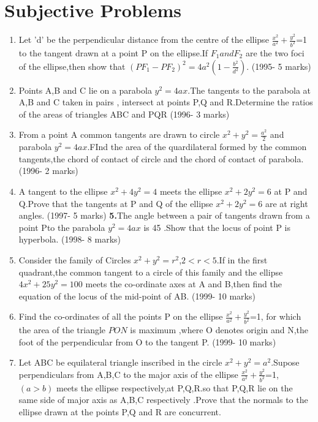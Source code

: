 \documentclass[journal,12pt,twocolumn]{IEEEtran}
\theoremstyle{remark}
\begin{document}
\section{Subjective Problems}
\begin{enumerate}
\item Let 'd' be the perpendicular distance from the centre of the ellipse $\frac{x^2}{a^2}+\frac{y^2}{b^2}$=1  to the tangent drawn at a point P on the ellipse.If $F_1 and F_2$ are the two foci of the ellipse,then show that $(P{F_1}-P{F_2})^2=4a^2(1-\frac{b^2}{d^2})$.
\hfill(1995- 5 marks)\break
\newline
\item Points A,B and C lie on a parabola $y^2=4ax$.The tangents to the parabola at A,B and C taken in pairs , intersect at points P,Q and R.Determine the ratios of the areas of triangles ABC and PQR \hfill(1996- 3 marks)\break\newline
\item From a point A common tangents  are drawn to circle $x^2+y^2=\frac{a^2}{2}$ and parabola $y^2=4ax$.FInd the area of the quardilateral formed by the common tangents,the chord of contact of circle and the chord of contact of parabola.
\hfill(1996- 2 marks)\break\newline
\item A tangent to the ellipse $x^2+4y^2=4$ meets the ellipse $x^2+2y^2=6$ at P and Q.Prove that the tangents at P and Q of the ellipse $x^2+2y^2=6$ are at right angles.
\hfill(1997- 5 marks)\break\newline
\textbf{5.}The angle between a pair of tangents drawn from a point Pto the parabola $y^2=4ax$ is 45 .Show that the locus of point P is hyperbola.
\hfill(1998- 8 marks)\break\newline
\item Consider the family of Circles $x^2+y^2=r^2$,$2<r<5$.If in the first quadrant,the common tangent to a circle of this family and the ellipse $4x^2+25y^2=100$ meets the co-ordinate axes at A and B,then find the equation of the locus of the mid-point  of AB.
\hfill(1999- 10 marks)\\
\item Find the co-ordinates of all the points P on the ellipse $\frac{x^2}{a^2}+\frac{y^2}{b^2}$=1, for which the area of the triangle $PON$ is maximum ,where O denotes origin  and N,the foot of the perpendicular from O to the tangent P.
\hfill(1999- 10 marks)\break\newline
\item  Let ABC be equilateral triangle inscribed in the circle $x^2+y^2=a^2$.Supose perpendiculars from A,B,C to the major axis of the ellipse $\frac{x^2}{a^2}+\frac{y^2}{b^2}$=1,$(a>b)$ meets the ellipse respectively,at P,Q,R.so that P,Q,R lie on the same side of major axis as A,B,C respectively .Prove that the normals to the ellipse drawn at the points P,Q and R are concurrent.

\end{enumerate}
\end{document}
